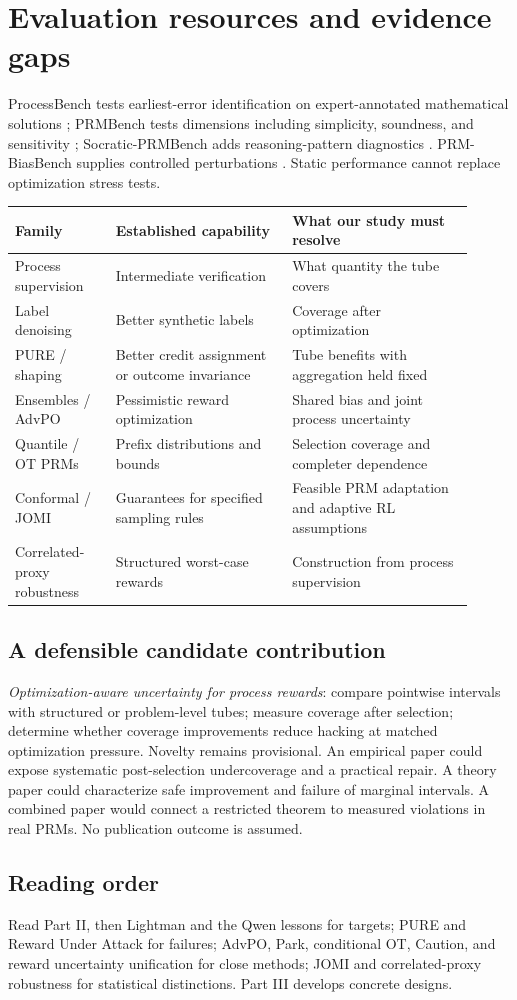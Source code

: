 \section{Evaluation resources and evidence gaps}
ProcessBench tests earliest-error identification on expert-annotated mathematical
solutions \cite{processbench}; PRMBench tests dimensions including simplicity,
soundness, and sensitivity \cite{prmbench}; Socratic-PRMBench adds reasoning-pattern
diagnostics \cite{socratic}. PRM-BiasBench supplies controlled perturbations
\cite{attack}. Static performance cannot replace optimization stress tests.

\begin{longtable}{p{0.20\linewidth}p{0.35\linewidth}p{0.36\linewidth}}
\toprule
Family & Established capability & What our study must resolve \\
\midrule
\endhead
Process supervision & Intermediate verification & What quantity the tube covers \\
Label denoising & Better synthetic labels & Coverage after optimization \\
PURE / shaping & Better credit assignment or outcome invariance & Tube benefits
with aggregation held fixed \\
Ensembles / AdvPO & Pessimistic reward optimization & Shared bias and joint
process uncertainty \\
Quantile / OT PRMs & Prefix distributions and bounds & Selection coverage and
completer dependence \\
Conformal / JOMI & Guarantees for specified sampling rules & Feasible PRM
adaptation and adaptive RL assumptions \\
Correlated-proxy robustness & Structured worst-case rewards & Construction from
process supervision \\
\bottomrule
\end{longtable}

\subsection{A defensible candidate contribution}
\emph{Optimization-aware uncertainty for process rewards}: compare pointwise
intervals with structured or problem-level tubes; measure coverage after
selection; determine whether coverage improvements reduce hacking at matched
optimization pressure. Novelty remains provisional. An empirical paper could
expose systematic post-selection undercoverage and a practical repair. A theory
paper could characterize safe improvement and failure of marginal intervals.
A combined paper would connect a restricted theorem to measured violations in
real PRMs. No publication outcome is assumed.

\subsection{Reading order}
Read Part II, then Lightman and the Qwen lessons for targets; PURE and Reward
Under Attack for failures; AdvPO, Park, conditional OT, Caution, and reward
uncertainty unification for close methods; JOMI and correlated-proxy robustness
for statistical distinctions. Part III develops concrete designs.
